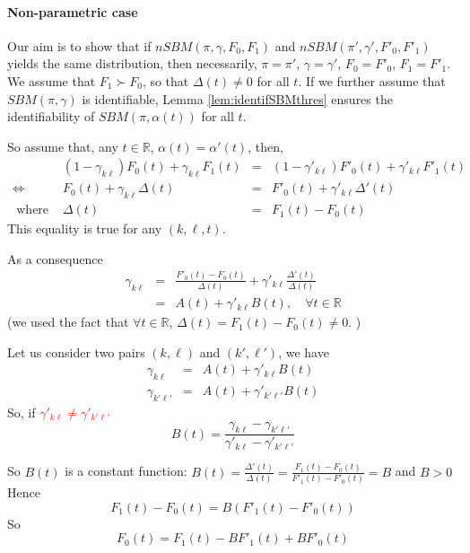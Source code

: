 \paragraph{Non-parametric case}
Our aim is to show that if $nSBM(\pi, \gamma, F_0, F_1)$ and $nSBM(\pi', \gamma', F'_0, F'_1)$ yields the same distribution, then necessarily, $\pi = \pi'$, $\gamma = \gamma'$, $F_0 = F'_0$, $F_1 = F'_1$. We assume that $F_1 \succ F_0$, so that $\Delta(t) \neq 0$ for all $t$. If we further assume that $SBM(\pi, \gamma)$ is identifiable, Lemma \ref{lem:identifSBMthres} ensures the identifiability of $SBM(\pi, \alpha(t))$ for all $t$.

So assume that,  any $t \in \mathbb{R}$,  $\alpha(t) = \alpha'(t)$, then, 
$$
\begin{array}{crcl}
& (1-\gamma_{k\ell}) F_0(t) + \gamma_{k\ell} F_1(t) &=& (1-\gamma'_{k\ell}) F'_0(t) + \gamma'_{k\ell} F'_1(t) \\
\Leftrightarrow&
 F_0(t) +\gamma_{k\ell}  \Delta(t) &=&F'_0(t) +  \gamma'_{k\ell} \Delta'(t)\\
 \mbox{ where }& \Delta(t) &=&F_1(t)-F_0(t)
\end{array}
$$
This equality is true for any $(k,\ell,t)$. 

As a consequence
\begin{eqnarray*}
 \gamma_{k\ell} &=& \frac{F'_0(t)  - F_0(t)}{\Delta(t)}+  \gamma'_{k\ell} \frac{\Delta'(t)}{\Delta(t)}\\
 &=& A(t) + \gamma'_{k\ell}B(t), \quad \forall t  \in \mathbb{R}
 \end{eqnarray*}
 (we used the fact that $\forall t \in \mathbb{R}$, $\Delta (t) = F_1(t) - F_0(t) \neq 0$. )
 
 Let us consider two pairs $(k,\ell)$ and $(k',\ell')$, we have 
\begin{eqnarray*}
 \gamma_{k\ell} &=& A(t) + \gamma'_{k\ell}B(t)\\
 \gamma_{k'\ell'} &=& A(t) + \gamma'_{k'\ell'}B(t)
 \end{eqnarray*}
So, if \textcolor{red}{$ \gamma'_{k\ell} \neq  \gamma'_{k'\ell'}$}
$$B(t)  = \frac{ \gamma_{k\ell}  -  \gamma_{k'\ell'} }{  \gamma'_{k\ell}-\gamma'_{k'\ell'} }
$$ 
 
 So $B(t)$ is a constant function: 
 $B(t) = \frac{\Delta'(t)}{\Delta(t)} = \frac{F_1(t) - F_0(t)}{F'_1(t) - F'_0(t)}  = B$
 and $B>0$
Hence 
 $$ F_1(t) - F_0(t) = B (F'_1(t) - F'_0(t))$$
 So 
 $$F_0(t) = F_1(t) - B  F'_1(t) +B  F'_0(t)$$
 

